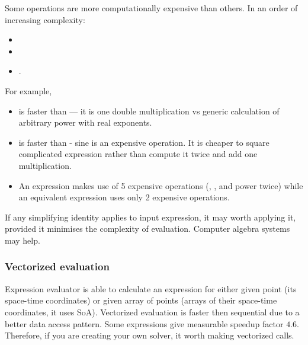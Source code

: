 Some operations are more computationally expensive than others. In an order of
increasing complexity:
\begin{itemize}
\item \inlsh{+, -, <, >, <=, >=, ==, }
\item {}
\item {}.
\end{itemize}

For example,
\begin{itemize}
\item {} is faster than  --- it is one double
multiplication vs generic calculation of arbitrary power with real exponents.
\item {} is faster than  -
sine is an expensive operation. It is cheaper to square complicated expression rather than
 compute it twice and add one multiplication.
\item An expression
 makes use of 5 expensive operations (, , 
 and power \inlsh{\^{}} twice) while an equivalent expression
 uses only 2 expensive operations.
\end{itemize}

If any simplifying identity applies to input expression, it may worth applying
it, provided it minimises the complexity of evaluation. Computer algebra systems
may help.

\subsubsection{Vectorized evaluation}

Expression evaluator is able to calculate an expression for either given point
(its space-time coordinates) or given array of points (arrays of their
space-time coordinates, it uses SoA). Vectorized evaluation is faster then
sequential due to a better data access pattern. Some expressions give measurable
speedup factor $4.6$. Therefore, if you are creating your own solver, it
worth making vectorized calls.

